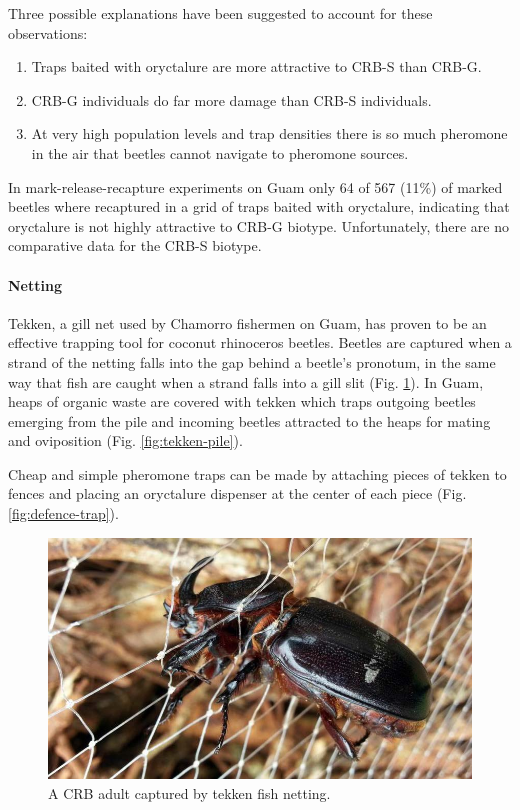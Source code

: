 \documentclass[twocolumn,letterpaper]{scrartcl}
\begin{document}
Three possible explanations have been suggested to account for these observations:
\begin{enumerate}
\item Traps baited with oryctalure are more attractive to CRB-S than CRB-G.
\item CRB-G individuals do far more damage than CRB-S individuals.
\item At very high population levels and trap densities there is so much pheromone in the air that beetles cannot navigate to pheromone sources.
\end{enumerate}

In mark-release-recapture experiments on Guam only 64 of 567 (11\%) of marked beetles where recaptured in a grid of traps baited with oryctalure, indicating that oryctalure is not highly attractive to CRB-G biotype. Unfortunately, there are no comparative data for the CRB-S biotype.  

\paragraph{Netting} Tekken, a gill net used by Chamorro fishermen on Guam, has proven to be an effective trapping tool for coconut rhinoceros beetles. Beetles are captured when a strand of the netting falls into the gap behind a beetle's pronotum, in the same way that fish are caught when a strand falls into a gill slit (Fig. \ref*{fig:tekken-beetle}). In Guam, heaps of organic waste are covered with tekken which traps outgoing beetles emerging from the pile and incoming beetles attracted to the heaps for mating and oviposition (Fig. \ref{fig:tekken-pile}). 

Cheap and simple pheromone traps can be made by attaching pieces of tekken to fences and placing an oryctalure dispenser at the center of each piece (Fig. \ref{fig:defence-trap}). 


\begin{figure}[h]
	\centering
	\includegraphics[width=0.7\linewidth]{images/tekken-beetle}
	\caption{A CRB adult captured by tekken fish netting.}
	\label{fig:tekken-beetle}
\end{figure}
\end{document}
